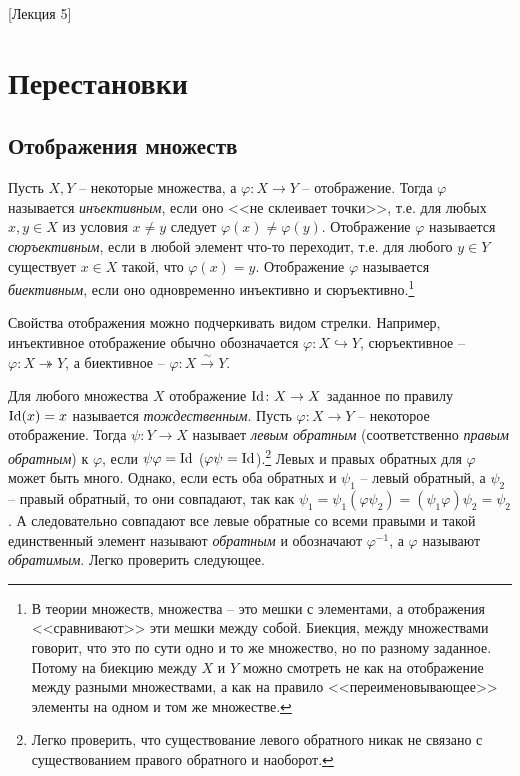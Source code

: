 [Лекция 5]
\newpage
\section{Перестановки}

\subsection{Отображения множеств}

Пусть $X,Y$ -- некоторые множества, а $\varphi\colon X\to Y$ -- отображение. Тогда $\varphi$ называется {\it инъективным}, если оно <<не склеивает точки>>, т.е. для любых $x,y\in X$ из условия $x\neq y$ следует $\varphi(x)\neq\varphi(y)$. Отображение $\varphi$ называется {\it сюръективным}, если в любой элемент что-то переходит, т.е. для любого $y\in Y$ существует $x\in X$ такой, что $\varphi(x)=y$. Отображение $\varphi$ называется {\it биективным}, если оно одновременно инъективно и сюръективно.\footnote{В теории множеств, множества -- это мешки с элементами, а отображения <<сравнивают>> эти мешки между собой. Биекция, между множествами говорит, что это по сути одно и то же множество, но по разному заданное. Потому на биекцию между $X$ и $Y$ можно смотреть не как на отображение между разными множествами, а как на правило <<переименовывающее>> элементы на одном и том же множестве.}

Свойства отображения можно подчеркивать видом стрелки. Например, инъективное отображение обычно обозначается $\varphi\colon X\hookrightarrow Y$, сюръективное -- $\varphi\colon X\twoheadrightarrow Y$, а биективное --  $\varphi\colon X\stackrel{\sim}{\longrightarrow}Y$.

Для любого множества $X$ отображение $\operatorname{Id}\colon X\to X$ заданное по правилу $\operatorname{Id}(x) = x$ называется {\it тождественным}. Пусть $\varphi\colon X\to Y$ -- некоторое отображение. Тогда $\psi\colon Y\to X$ называет {\it левым обратным} (соответственно {\it правым обратным}) к $\varphi$, если $\psi\varphi = \operatorname{Id}$ ($\varphi\psi = \operatorname{Id}$).\footnote{Легко проверить, что существование левого обратного никак не связано с существованием правого обратного и наоборот.} Левых и правых обратных для $\varphi$ может быть много. Однако, если есть оба обратных и $\psi_1$ -- левый обратный, а $\psi_2$ -- правый обратный, то они совпадают, так как $\psi_1 = \psi_1 (\varphi \psi_2) = (\psi_1\varphi)\psi_2 = \psi_2$. А следовательно совпадают все левые обратные со всеми правыми и такой единственный элемент называют {\it обратным} и обозначают $\varphi^{-1}$, а $\varphi$ называют {\it обратимым}. Легко проверить следующее.

